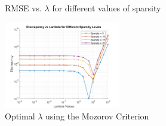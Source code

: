 \documentclass[a4paper,12pt]{article}
\begin{document}
\begin{figure}[htbp]
  \centering
  \caption{RMSE vs. $\lambda$ for different values of sparsity}
  \label{fig:rmse}
\end{figure}

\begin{figure}[htbp]
  \centering
  \includegraphics[width=0.45\textwidth]{mozorovCriterion.png}
  \caption{Optimal $\lambda$ using the Mozorov Criterion}
  \label{fig:mozorov}
\end{figure}
\end{document}

